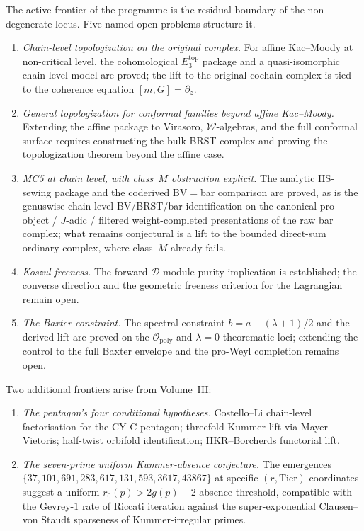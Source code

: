 \documentclass[11pt]{article}
\providecommand{\cO}{\mathcal{O}}
\providecommand{\cW}{\mathcal{W}}
\begin{document}
\noindent
The active frontier of the programme is the residual boundary of the
non-degenerate locus. Five named open problems structure it.

\begin{enumerate}[label=\textup{F\arabic*.}]
\item \emph{Chain-level topologization on the original complex.}
For affine Kac--Moody at non-critical level, the cohomological
$E_3^{\mathrm{top}}$ package and a quasi-isomorphic chain-level model
are proved; the lift to the original cochain complex is tied to the
coherence equation $[m,G] = \partial_z$.
\item \emph{General topologization for conformal families beyond
affine Kac--Moody.} Extending the affine package to Virasoro,
$\cW$-algebras, and the full conformal surface requires constructing
the bulk BRST complex and proving the topologization theorem beyond
the affine case.
\item \emph{MC5 at chain level, with class~$M$ obstruction
explicit.} The analytic HS-sewing package and the coderived
BV$=$bar comparison are proved, as is the genuswise chain-level
BV/BRST/bar identification on the canonical pro-object / $J$-adic /
filtered weight-completed presentations of the raw bar complex; what
remains conjectural is a lift to the bounded direct-sum ordinary
complex, where class~$M$ already fails.
\item \emph{Koszul freeness.} The forward
$\mathcal{D}$-module-purity implication is established; the converse
direction and the geometric freeness criterion for the Lagrangian
remain open.
\item \emph{The Baxter constraint.} The spectral constraint
$b = a - (\lambda + 1)/2$ and the derived lift are proved on the
$\cO_{\mathrm{poly}}$ and $\lambda = 0$ theorematic loci; extending
the control to the full Baxter envelope and the pro-Weyl completion
remains open.
\end{enumerate}

Two additional frontiers arise from Volume~III:

\begin{enumerate}[label=\textup{F\arabic*.}, start=6]
\item \emph{The pentagon's four conditional hypotheses.}
Costello--Li chain-level factorisation for the CY-C pentagon;
threefold Kummer lift via Mayer--Vietoris; half-twist orbifold
identification; HKR--Borcherds functorial lift.
\item \emph{The seven-prime uniform Kummer-absence conjecture.}
The emergences $\{37, 101, 691, 283, 617, 131, 593, 3617, 43867\}$
at specific $(r, \mathrm{Tier})$ coordinates suggest a uniform
$r_0(p) > 2g(p)-2$ absence threshold, compatible with the
Gevrey-$1$ rate of Riccati iteration against the
super-exponential Clausen--von Staudt sparseness of
Kummer-irregular primes.
\end{enumerate}
\end{document}
